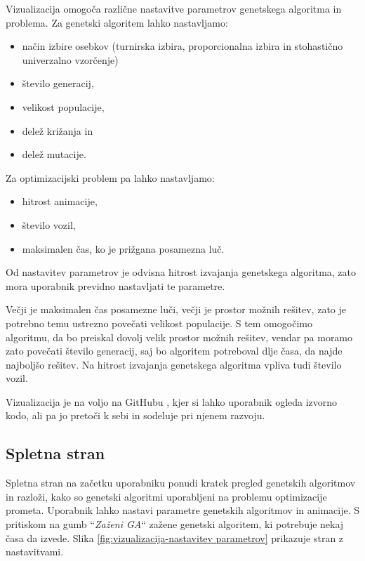 \documentclass[a4paper, 12pt]{book}
\begin{document}
Vizualizacija omogo\v ca razli\v cne nastavitve parametrov genetskega algoritma in problema. Za genetski algoritem lahko nastavljamo:

\begin{itemize}
\item na\v cin izbire osebkov (turnirska izbira, proporcionalna izbira in stohasti\v cno univerzalno vzor\v cenje)
\item \v stevilo generacij,
\item velikost populacije,
\item dele\v z kri\v zanja in
\item dele\v z mutacije.
\end{itemize}

Za optimizacijski problem pa lahko nastavljamo:

\begin{itemize}
\item hitrost animacije,
\item \v stevilo vozil,
\item maksimalen \v cas, ko je pri\v zgana posamezna lu\v c.
\end{itemize}

Od nastavitev parametrov je odvisna hitrost izvajanja genetskega algoritma, zato mora uporabnik previdno nastavljati te parametre.

Ve\v cji je maksimalen \v cas posamezne lu\v ci, ve\v cji je prostor mo\v znih re\v sitev, zato je potrebno temu ustrezno pove\v cati velikost populacije. S tem omogo\v cimo algoritmu, da bo preiskal dovolj velik prostor mo\v znih re\v sitev, vendar pa moramo zato pove\v cati \v stevilo generacij, saj bo algoritem potreboval dlje \v casa, da najde najbolj\v so re\v sitev. Na hitrost izvajanja genetskega algoritma vpliva tudi \v stevilo vozil.

Vizualizacija je na voljo na GitHubu \cite{izvorna koda}, kjer si lahko uporabnik ogleda izvorno kodo, ali pa jo preto\v ci k sebi in sodeluje pri njenem razvoju.

\subsection{Spletna stran}
Spletna stran na za\v cetku uporabniku ponudi kratek pregled genetskih algoritmov in razlo\v zi, kako so genetski algoritmi uporabljeni na problemu optimizacije prometa. Uporabnik lahko nastavi parametre genetskih algoritmov in animacije. S pritiskom na gumb ``\textit{Za\v zeni GA}`` za\v zene genetski algoritem, ki potrebuje nekaj \v casa da izvede. Slika \ref{fig:vizualizacija-nastavitev parametrov} prikazuje stran z nastavitvami. 
\end{document}
